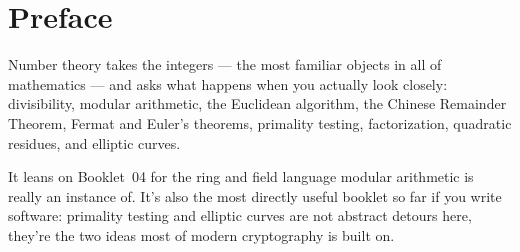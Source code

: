 \chapter*{Preface}

Number theory takes the integers --- the most familiar objects
in all of mathematics --- and asks what happens when you actually look
closely: divisibility, modular arithmetic, the Euclidean algorithm,
the Chinese Remainder Theorem, Fermat and Euler's theorems, primality
testing, factorization, quadratic residues, and elliptic curves.

It leans on Booklet~04 for the ring and field language modular
arithmetic is really an instance of. It's also the most directly
useful booklet so far if you write software: primality testing and
elliptic curves are not abstract detours here, they're the two ideas
most of modern cryptography is built on.
